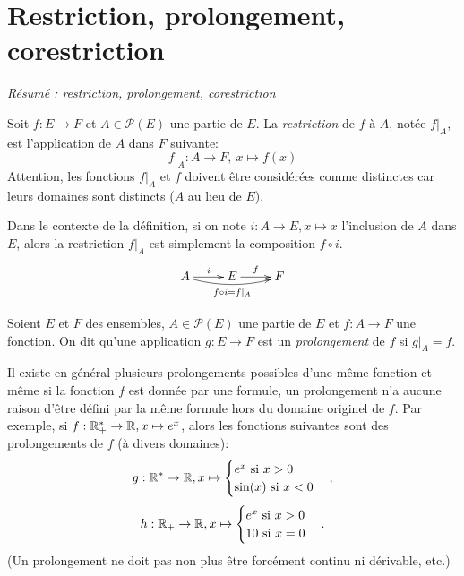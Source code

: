 


\section{Restriction, prolongement, corestriction}

\emph{Résumé : restriction, prolongement, corestriction}

\begin{definition}[Restriction]
\label{def-restriction}
Soit $f : E\to F$ et $A \in \mathcal P(E)$ une partie de $E$. La \emph{restriction} de $f$ à $A$, notée $f|_{A}$, est l'application de $A$ dans $F$ suivante:
\[
f|_{A} : A\to F, \: x\mapsto f(x)
\]
Attention, les fonctions $f|_A$ et $f$ doivent être considérées comme distinctes car leurs domaines sont distincts ($A$ au lieu de $E$).
\end{definition}

\begin{remarque}
Dans le contexte de la définition, si on note $i : A\to E, x\mapsto x$ l'inclusion de $A$ dans $E$, alors la restriction $f|_A$ est simplement la composition $f\circ i$.
\[\xymatrix{
A \ar[r]^{i} \ar@/_/[rr]_{f\circ i = f|_A} & E \ar[r]^f & F
}\]
\end{remarque}

\begin{definition}[Prolongement]
Soient $E$ et $F$ des ensembles, $A\in \mathcal P(E)$ une partie de $E$ et $f : A\to F$ une fonction. On dit qu'une application $g : E\to F$ est un \emph{prolongement} de $f$ si $g|_A = f$.
\end{definition}

\begin{attention}
Il existe en général plusieurs prolongements possibles d'une même fonction et même si la fonction $f$ est donnée par une formule, un prolongement n'a aucune raison d'être défini par la même formule hors du domaine originel de $f$. Par exemple, si $f : \mathbb{R}_+^* \to \mathbb{R}, x\mapsto e^x$, alors les fonctions suivantes  sont des prolongements de $f$ (à divers domaines):
\[g : \mathbb{R}^* \to \mathbb{R}, x\mapsto \begin{cases}e^x\text{ si } x>0\\ \sin(x) \text{ si } x<0\end{cases},\]
\[h : \mathbb{R}_+ \to \mathbb{R}, x\mapsto \begin{cases}e^x\text{ si } x>0\\ 10 \text{ si }x=0\end{cases}.\]
(Un prolongement ne doit pas non plus être forcément continu ni dérivable, etc.)
\end{attention}


